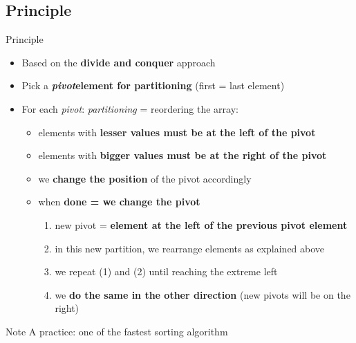 \documentclass{beamer}[10pt, usepdftitle=false, handout]
\begin{document}
	\subsection{Principle}
	\begin{frame}
	
	\begin{block}{Principle}
	\begin{itemize}
	\item {Based on the \textbf{divide and conquer} approach}
	\item {Pick a \textbf{\textit{pivot}\footnotemark[2] element for partitioning} (first = last element)\footnotemark[3]}
	\item {For each \textit{pivot}: \textit{partitioning} = reordering the array: 
		\begin{itemize}
			\item {elements with \textbf{lesser values must be at the left of the pivot}}	
			\item {elements with \textbf{bigger values must be at the right of the pivot}}
			\item {we \textbf{change the position} of the pivot accordingly}
			\item {when \textbf{done = we change the pivot} \begin{enumerate}
				\item {new pivot = \textbf{element at the left of the previous pivot element}}
				\item {in this new partition\footnotemark[4], we rearrange elements as explained above}
				\item {we repeat (1) and (2) until reaching the extreme left}
				\item {we \textbf{do the same in the other direction} (new pivots will be on the right)}
			\end{enumerate}		
			}
		\end{itemize}			
	}
	\end{itemize}
	\end{block}	
	
	
	
	
	\begin{block}{Note}
	A practice: one of the fastest sorting algorithm
	\end{block}
	
		
	
	\end{frame}	
	
\end{document}
